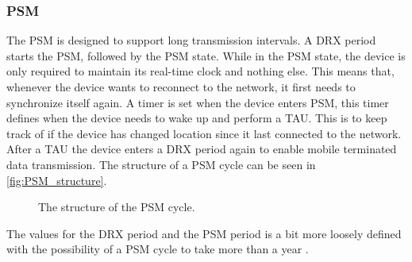 \subsubsection{PSM}
The PSM is designed to support long transmission intervals. A DRX period starts the PSM, followed by the PSM state. While in the PSM state, the device is only required to maintain its real-time clock and nothing else. This means that, whenever the device wants to reconnect to the network, it first needs to synchronize itself again. A timer is set when the device enters PSM, this timer defines when the device needs to wake up and perform a \gls{TAU}. This is to keep track of if the device has changed location since it last connected to the network. After a TAU the device enters a DRX period again to enable mobile terminated data transmission. The structure of a PSM cycle can be seen in \autoref{fig:PSM_structure}.

\begin{figure}[H]
\centering
\resizebox{\textwidth}{!}{
}
\caption{The structure of the \gls{PSM} cycle.}
\label{fig:PSM_structure}
\end{figure}

The values for the DRX period and the PSM period is a bit more loosely defined with the possibility of a PSM cycle to take more than a year \citep{NB-IoT_Book}.





